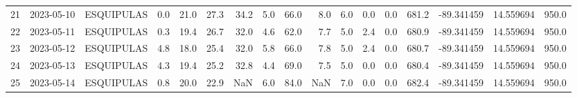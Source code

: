 \documentclass[12pt]{article}
\begin{document}
\begin{center}
\begin{tabular}{lllrrrrrrrrrrrrrr}
21  & 2023-05-10 &  ESQUIPULAS &     0.0 &  21.0 &   27.3 &  34.2 &      5.0 &     66.0 &        8.0 &  6.0 &         0.0 &         0.0 &      681.2 & -89.341459 &  14.559694 &    950.0 \\
22  & 2023-05-11 &  ESQUIPULAS &     0.3 &  19.4 &   26.7 &  32.0 &      4.6 &     62.0 &        7.7 &  5.0 &         2.4 &         0.0 &      680.9 & -89.341459 &  14.559694 &    950.0 \\
23  & 2023-05-12 &  ESQUIPULAS &     4.8 &  18.0 &   25.4 &  32.0 &      5.8 &     66.0 &        7.8 &  5.0 &         2.4 &         0.0 &      680.7 & -89.341459 &  14.559694 &    950.0 \\
24  & 2023-05-13 &  ESQUIPULAS &     4.3 &  19.4 &   25.2 &  32.8 &      4.4 &     69.0 &        7.5 &  5.0 &         0.0 &         0.0 &      680.4 & -89.341459 &  14.559694 &    950.0 \\
25  & 2023-05-14 &  ESQUIPULAS &     0.8 &  20.0 &   22.9 &   NaN &      6.0 &     84.0 &        NaN &  7.0 &         0.0 &         0.0 &      682.4 & -89.341459 &  14.559694 &    950.0 \\
\bottomrule
\end{tabular}

        
        \end{center}
        
\end{document}
